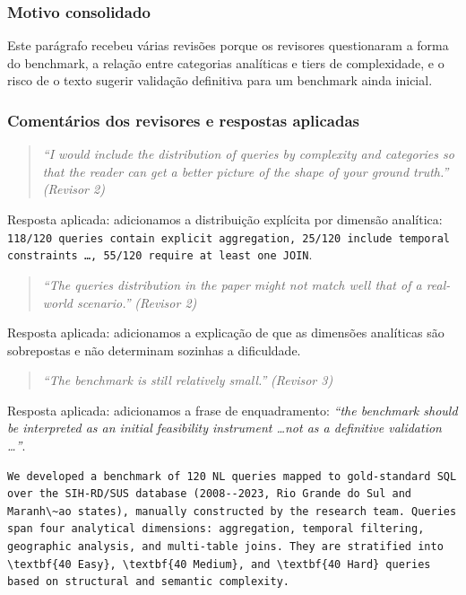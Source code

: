 \documentclass[11pt,a4paper]{article}
\begin{document}
\subsubsection*{Motivo consolidado}

Este parágrafo recebeu várias revisões porque os revisores questionaram a forma do benchmark, a relação entre categorias analíticas e tiers de complexidade, e o risco de o texto sugerir validação definitiva para um benchmark ainda inicial.

\subsubsection*{Comentários dos revisores e respostas aplicadas}

\begin{quote}
\textit{``I would include the distribution of queries by complexity and categories so that the reader can get a better picture of the shape of your ground truth.''}
\hfill\textit{(Revisor 2)}
\end{quote}

\noindent Resposta aplicada: adicionamos a distribuição explícita por dimensão analítica: \texttt{118/120 queries contain explicit aggregation, 25/120 include temporal constraints \ldots, 55/120 require at least one JOIN}.

\begin{quote}
\textit{``The queries distribution in the paper might not match well that of a real-world scenario.''}
\hfill\textit{(Revisor 2)}
\end{quote}

\noindent Resposta aplicada: adicionamos a explicação de que as dimensões analíticas são sobrepostas e não determinam sozinhas a dificuldade.

\begin{quote}
\textit{``The benchmark is still relatively small.''} \hfill\textit{(Revisor 3)}
\end{quote}

\noindent Resposta aplicada: adicionamos a frase de enquadramento: \textit{``the benchmark should be interpreted as an initial feasibility instrument \ldots not as a definitive validation \ldots''}.

\begin{originalblock}
\begin{lstlisting}[style=texsnippet]
We developed a benchmark of 120 NL queries mapped to gold-standard SQL over the SIH-RD/SUS database (2008--2023, Rio Grande do Sul and Maranh\~ao states), manually constructed by the research team. Queries span four analytical dimensions: aggregation, temporal filtering, geographic analysis, and multi-table joins. They are stratified into \textbf{40 Easy}, \textbf{40 Medium}, and \textbf{40 Hard} queries based on structural and semantic complexity.
\end{lstlisting}
\end{originalblock}
\end{document}
